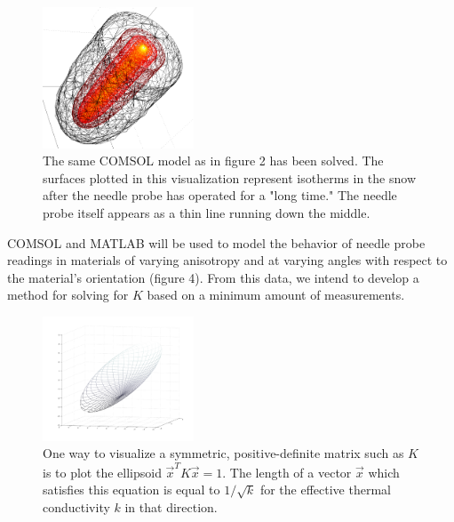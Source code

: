 \documentclass[12pt, letterpaper]{article}
\begin{document}
\begin{figure}
\centering
\label{fig:isotherms}
\includegraphics[width=0.4\textwidth]{isotherms}
\caption{The same COMSOL model as in figure 2 has been solved. The surfaces plotted in this visualization represent isotherms in the snow after the needle probe has operated for a "long time." The needle probe itself appears as a thin line running down the middle.}
\end{figure}

COMSOL and MATLAB will be used to model the behavior of needle probe readings in materials of varying anisotropy and at varying angles with respect to the material's orientation (figure 4). From this data, we intend to develop a method for solving for \(K\) based on a minimum amount of measurements.


\begin{figure}
\centering
\label{fig:m_ellipsoid}
\includegraphics[width=0.4\textwidth]{m_ellipsoid}
\caption{One way to visualize a symmetric, positive-definite matrix such as \(K\) is to plot the ellipsoid \(\vec{x}^TK\vec{x}=1\). The length of a vector \(\vec{x}\) which satisfies this equation is equal to \(1/\sqrt{k}\) for the effective thermal conductivity \(k\) in that direction.}
\end{figure}
\end{document}

